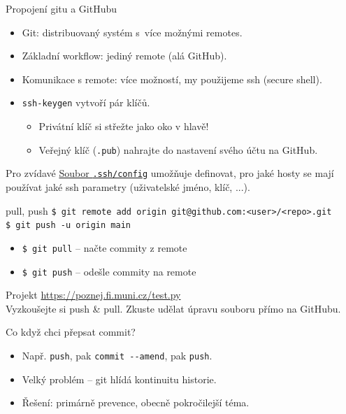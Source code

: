 \documentclass[
]{beamer}
\begin{document}
\begin{frame}{Propojení gitu a GitHubu}
\begin{itemize}
	\item Git: distribuovaný systém s více možnými remotes.
	\item Základní workflow: jediný remote (alá GitHub).
	\item Komunikace s remote: více možností, my použijeme ssh (secure shell).
	\item \texttt{ssh-keygen} vytvoří pár klíčů.
	\begin{itemize}
		\item Privátní klíč si střežte jako oko v hlavě!
		\item Veřejný klíč (\texttt{.pub}) nahrajte do nastavení svého účtu na GitHub.
	\end{itemize}
\end{itemize}

\begin{block}{Pro zvídavé}
\href{https://linuxize.com/post/using-the-ssh-config-file/}{Soubor \texttt{.ssh/config}} umožňuje definovat,
pro jaké hosty se mají používat jaké ssh parametry (uživatelské jméno, klíč, ...).
\end{block}
\end{frame}


\begin{frame}{pull, push}
\texttt{\$ git remote add origin git@github.com:<user>/<repo>.git} \\
\texttt{\$ git push -u origin main} \\

\begin{itemize}
	\item \texttt{\$ git pull} – načte commity z remote
	\item \texttt{\$ git push} – odešle commity na remote
\end{itemize}

\begin{block}{Projekt}
\url{https://poznej.fi.muni.cz/test.py} \\
Vyzkoušejte si push \& pull. Zkuste udělat úpravu souboru přímo na GitHubu.
\end{block}
\end{frame}


\begin{frame}{Co když chci přepsat commit?}
\begin{itemize}
	\item Např. \texttt{push}, pak \texttt{commit -{}-amend}, pak \texttt{push}.
	\pause
	\item Velký problém – git hlídá kontinuitu historie.
	\item Řešení: primárně prevence, obecně pokročilejší téma.
\end{itemize}
\end{frame}
\end{document}

